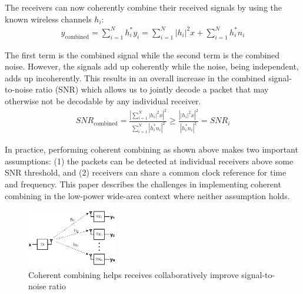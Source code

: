 

The receivers can now coherently combine their received signals by using the known wireless channels $h_i$:
\begin{align*}
y_{\text{combined}}
	= \sum_{i=1}^N h^*_i y_i
	= \sum_{i=1}^N \left| h_i \right|^2 x + \sum_{i=1}^N h^*_i n_i
\end{align*}

The first term is the combined signal while the second term is the combined
noise. However, the signals add up coherently while the noise, being
independent, adds up incoherently.  This results in an overall increase in the
combined signal-to-noise ratio (SNR) which allows us to jointly decode a packet that may otherwise not be decodable by any individual receiver.
\begin{align*}
SNR_{\text{combined}} %
	= \frac{\left| \sum_{i=1}^N \left| h_i \right|^2 x \right|^2}{\sum_{i=1}^N \left| h^*_i n_i \right|^2} 
	\geq \frac{\left| \left| h_i \right|^2 x \right|^2}{\left| h^*_i n_i \right|^2} = SNR_i
\end{align*}

In practice, performing coherent combining as shown above makes two important assumptions: (1) the packets can be detected at individual receivers above some SNR threshold, and (2) receivers can share a common clock reference for time and frequency. This paper describes the challenges in implementing coherent combining in the low-power wide-area context where neither assumption holds. 

\begin{figure}[htb]
    \centering
    \includegraphics[width=0.35\textwidth, height=1in]{figures/SIMO_cropped}
    \caption{Coherent combining helps receives collaboratively improve signal-to-noise ratio}
    \label{fig:simo}
\end{figure}

